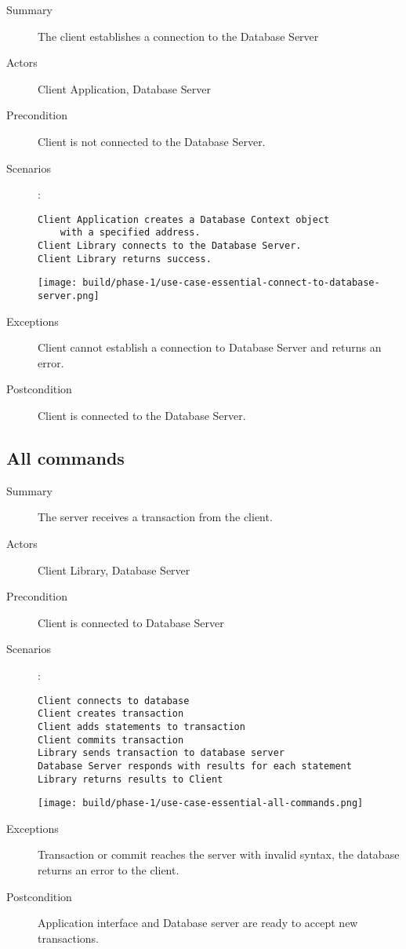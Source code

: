 \documentclass[a4paper]{report}
\begin{document}
	\begin{description}
		\item[Summary] The client establishes a connection to the Database Server
		\item[Actors] Client Application, Database Server 
		\item[Precondition] Client is not connected to the Database Server.
		\item[Scenarios] :
		
		\begin{lstlisting}
Client Application creates a Database Context object
	with a specified address.
Client Library connects to the Database Server.
Client Library returns success.
		\end{lstlisting}

		\begin{center}
			\texttt{[image: build/phase-1/use-case-essential-connect-to-database-server.png]}
		\end{center}

		\item[Exceptions] Client cannot establish a connection to Database Server and returns an error.
		\item[Postcondition] Client is connected to the Database Server.
	\end{description}

	\pagebreak

	\subsection{All commands}

	\begin{description}
		\item[Summary] The server receives a transaction from the client.
		\item[Actors] Client Library, Database Server
		\item[Precondition] Client is connected to Database Server
		\item[Scenarios] :

		\begin{lstlisting}
Client connects to database
Client creates transaction
Client adds statements to transaction
Client commits transaction
Library sends transaction to database server
Database Server responds with results for each statement
Library returns results to Client
		\end{lstlisting}

		\begin{center}
			\texttt{[image: build/phase-1/use-case-essential-all-commands.png]}
		\end{center}

		\item[Exceptions] Transaction or commit reaches the server with invalid syntax, the database returns an error to the client.
		\item[Postcondition] Application interface and Database server are ready to accept new transactions.
	\end{description}
	
\end{document}
